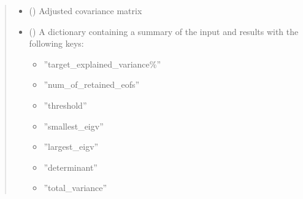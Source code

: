 \documentclass[letterpaper,10pt,english]{sphinxmanual}
\begin{document}
\begin{fulllineitems}
\begin{quote}
\begin{description}
\sphinxAtStartPar
\begin{itemize}
\item {}
\sphinxAtStartPar
{} () \textendash{} Adjusted covariance matrix

\item {}
\sphinxAtStartPar
{} () \textendash{} A dictionary containing a summary of the input and results with the
following keys:
\begin{itemize}
\item {}
\sphinxAtStartPar
”target\_explained\_variance\%”

\item {}
\sphinxAtStartPar
”num\_of\_retained\_eofs”

\item {}
\sphinxAtStartPar
”threshold”

\item {}
\sphinxAtStartPar
”smallest\_eigv”

\item {}
\sphinxAtStartPar
”largest\_eigv”

\item {}
\sphinxAtStartPar
”determinant”

\item {}
\sphinxAtStartPar
”total\_variance”

\end{itemize}

\end{itemize}


\end{description}\end{quote}

\end{fulllineitems}

\end{document}

